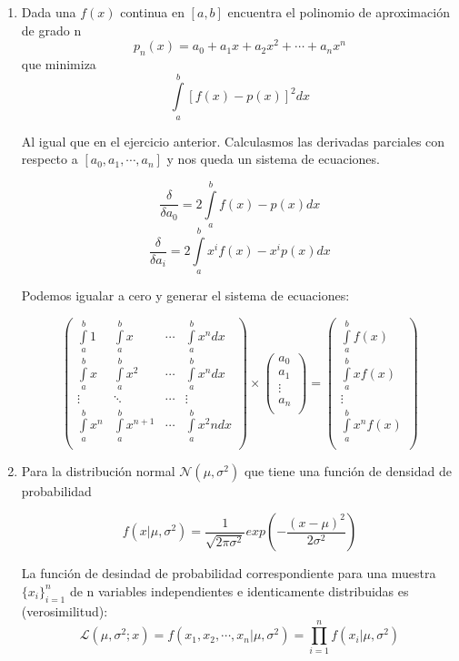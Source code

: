 \documentclass{article}
\begin{document}
\begin{enumerate}
\item Dada una $f(x)$ continua en $[a, b]$ encuentra el polinomio de aproximación de grado n 
$$p_n(x) = a_0 + a_1x + a_2x^2 + \cdots + a_nx^n$$
que minimiza
$$\int\limits_a^b[f(x) - p(x)]^2 dx$$

Al igual que en el ejercicio anterior. Calculasmos las derivadas parciales con respecto a $[a_0, a_1, \cdots, a_n]$ y nos queda un sistema de ecuaciones.

$$\frac{\delta}{\delta a_0} = 2 \int\limits_a^b f(x) - p(x) dx$$
$$\frac{\delta}{\delta a_i} = 2 \int\limits_a^b x^if(x) - x^ip(x) dx$$

Podemos igualar a cero y generar el sistema de ecuaciones:

$$
 \begin{pmatrix}
  \int\limits_a^b 1 & \int\limits_a^b x & \cdots& \int\limits_a^b x^n dx\\
  \int\limits_a^b x  & \int\limits_a^b x^2 & \cdots& \int\limits_a^b x^n dx\\
  \vdots  & \ddots & \cdots & \vdots\\
  \int\limits_a^b x^n  & \int\limits_a^b x^{n+1} & \cdots& \int\limits_a^b x^2n dx\\
 \end{pmatrix} \times 
 \begin{pmatrix}
  a_0 \\
  a_1 \\
  \vdots \\
  a_n\\
 \end{pmatrix}= 
  \begin{pmatrix}
  \int\limits_a^b f(x) \\
  \int\limits_a^b xf(x) \\
  \vdots \\
  \int\limits_a^b x^n f(x)\\
 \end{pmatrix}
$$
\item Para la distribución normal $\mathcal{N}(\mu, \sigma^2)$ que tiene una función de densidad de probabilidad 

$$f(x | \mu, \sigma^2) = \frac{1}{\sqrt{2\pi\sigma^2}}exp\left(-\frac{(x-\mu)^2}{2\sigma^2}\right)$$

La función de desindad de probabilidad correspondiente para una muestra $\{x_i\}_{i=1}^n$ de n variables independientes e identicamente distribuidas es (verosimilitud):
$$\mathcal{L}(\mu, \sigma^2; x) = f(x_1, x_2, \cdots, x_n | \mu,\sigma^2) = \prod_{i=1}^{n}f(x_i| \mu,\sigma^2)$$


\end{enumerate}
\end{document}
